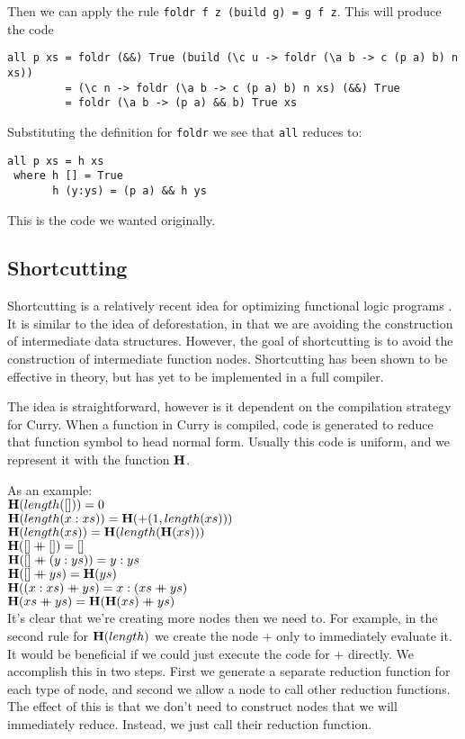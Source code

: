 Then we can apply the rule \texttt{foldr f z (build g) = g f z}.  This will produce the code
\begin{verbatim}
all p xs = foldr (&&) True (build (\c u -> foldr (\a b -> c (p a) b) n xs))
         = (\c n -> foldr (\a b -> c (p a) b) n xs) (&&) True 
         = foldr (\a b -> (p a) && b) True xs
\end{verbatim}
Substituting the definition for \texttt{foldr} we see that \texttt{all} reduces to:
\begin{verbatim}
all p xs = h xs
 where h [] = True
       h (y:ys) = (p a) && h ys
\end{verbatim}
This is the code we wanted originally.

\subsection{Shortcutting}
Shortcutting is a relatively recent idea for optimizing functional logic programs \cite{shortcutting}.
It is similar to the idea of deforestation, in that we are avoiding the construction of intermediate data structures.
However, the goal of shortcutting is to avoid the construction of intermediate function nodes.
Shortcutting has been shown to be effective in theory, but has yet to be implemented in a full compiler.

The idea is straightforward, however is it dependent on the compilation strategy for Curry.
When a function in Curry is compiled, code is generated to reduce that function symbol to head normal form.
Usually this code is uniform, and we represent it with the function $\mbox{\bf H}$.

\noindent
As an example:\\
$\mbox{\bf H}(length([])) = 0$\\
$\mbox{\bf H}(length(x:xs)) = \mbox{\bf H}(+(1,length(xs)))$\\
$\mbox{\bf H}(length(xs)) = \mbox{\bf H}(length(\mbox{\bf H}(xs)))$\\
$\ $\\
$\mbox{\bf H}([]\mathbin{+\mkern-10mu+} []) = []$\\
$\mbox{\bf H}([]\mathbin{+\mkern-10mu+} (y:ys)) = y : ys$\\
$\mbox{\bf H}([]\mathbin{+\mkern-10mu+} ys) = \mbox{\bf H}(ys)$\\
$\mbox{\bf H}((x:xs)\mathbin{+\mkern-10mu+} ys) = x : (xs\mathbin{+\mkern-10mu+} ys)$\\
$\mbox{\bf H}(xs\mathbin{+\mkern-10mu+} ys) = \mbox{\bf H}(\mbox{\bf H}(xs) \mathbin{+\mkern-10mu+}  ys)$\\

It's clear that we're creating more nodes then we need to.
For example, in the second rule for $\mbox{\bf H}(length)$ we create the node $+$ only to immediately evaluate it.
It would be beneficial if we could just execute the code for $+$ directly.
We accomplish this in two steps.
First we generate a separate reduction function for each type of node,
and second we allow a node to call other reduction functions.
The effect of this is that we don't need to construct nodes that we will immediately reduce.
Instead, we just call their reduction function.

